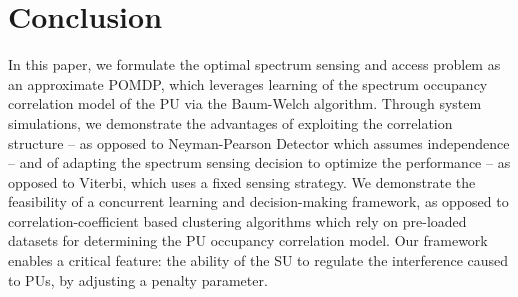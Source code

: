 \documentclass[10pt,twocolumn]{IEEEtran}
\begin{document}
\section{Conclusion}\label{V}
In this paper, we formulate the optimal spectrum sensing and access problem as an approximate POMDP, which leverages learning of the spectrum occupancy correlation model of the PU via the Baum-Welch algorithm. Through system simulations, we demonstrate the advantages of exploiting the correlation structure -- as opposed to Neyman-Pearson Detector which assumes independence -- and of adapting the spectrum sensing decision to optimize the performance -- as opposed to Viterbi, which uses a fixed sensing strategy. We demonstrate the feasibility of a concurrent learning and decision-making framework, as opposed to correlation-coefficient based clustering algorithms which rely on pre-loaded datasets for determining the PU occupancy correlation model. Our framework enables a critical feature: the ability of the SU to regulate the interference caused to PUs, by adjusting a penalty parameter.
\vspace{-7mm}


\end{document}
